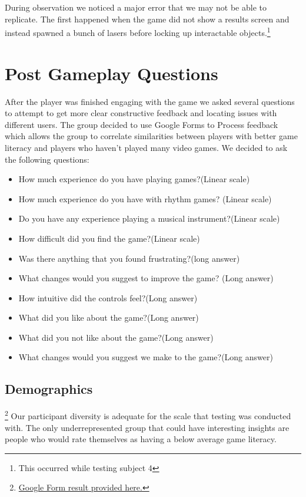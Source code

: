 \documentclass[twoside,twocolumn]{article}
\begin{document}
During observation we noticed a major error that we may not be able to replicate.
The first happened when the game did not show a results screen and instead spawned a bunch of lasers
before locking up interactable objects.\footnote{This occurred while testing subject 4}




\section{Post Gameplay Questions}
After the player was finished engaging with the game we asked several questions to
attempt to get more clear constructive feedback and locating issues with different
 users. The group decided to use Google Forms to Process feedback which allows the group
 to correlate similarities between players with better game literacy and players who haven't played many video games. We decided to ask the following questions:

\begin{itemize}
\item How much experience do you have playing games?(Linear scale)
\item How much experience do you have with rhythm games? (Linear scale)
\item Do you have any experience playing a musical instrument?(Linear scale)
\item How difficult did you find the game?(Linear scale)
\item Was there anything that you found frustrating?(long answer)
\item What changes would you suggest to improve the game? (Long answer)
\item How intuitive did the controls feel?(Long answer)
\item What did you like about the game?(Long answer)
\item What did you not like about the game?(Long answer)
\item What changes would you suggest we make to the game?(Long answer)
\end{itemize}
\subsection{Demographics}\footnote{\hyperlink{https://docs.google.com/spreadsheets/d/1ANOVLghsAPeU3L3zo1TeeCbxSlEFg69GmU0cMx_n9CA/edit?usp=sharing}{Google Form result provided here.}}
Our participant diversity is adequate for the scale that testing was conducted with.
The only underrepresented group  that could have interesting insights are people who would
rate themselves as having a below average game literacy.
\end{document}
